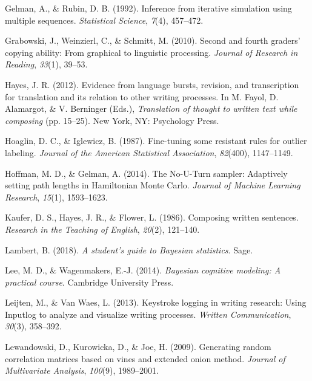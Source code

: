 \documentclass[english,jou,floatsintext]{apa7}
\begin{document}
\leavevmode\hypertarget{ref-gelman1992}{}%
Gelman, A., \& Rubin, D. B. (1992). Inference from iterative simulation using multiple sequences. \emph{Statistical Science}, \emph{7}(4), 457--472.

\leavevmode\hypertarget{ref-grabowski2010second}{}%
Grabowski, J., Weinzierl, C., \& Schmitt, M. (2010). Second and fourth graders' copying ability: From graphical to linguistic processing. \emph{Journal of Research in Reading}, \emph{33}(1), 39--53.

\leavevmode\hypertarget{ref-hayes2012evidence}{}%
Hayes, J. R. (2012). Evidence from language bursts, revision, and transcription for translation and its relation to other writing processes. In M. Fayol, D. Alamargot, \& V. Berninger (Eds.), \emph{Translation of thought to written text while composing} (pp. 15--25). New York, NY: Psychology Press.

\leavevmode\hypertarget{ref-hoaglin1987fine}{}%
Hoaglin, D. C., \& Iglewicz, B. (1987). Fine-tuning some resistant rules for outlier labeling. \emph{Journal of the American Statistical Association}, \emph{82}(400), 1147--1149.

\leavevmode\hypertarget{ref-hoffman2014no}{}%
Hoffman, M. D., \& Gelman, A. (2014). The No-U-Turn sampler: Adaptively setting path lengths in Hamiltonian Monte Carlo. \emph{Journal of Machine Learning Research}, \emph{15}(1), 1593--1623.

\leavevmode\hypertarget{ref-kaufer1986composing}{}%
Kaufer, D. S., Hayes, J. R., \& Flower, L. (1986). Composing written sentences. \emph{Research in the Teaching of English}, \emph{20}(2), 121--140.

\leavevmode\hypertarget{ref-lambert2018student}{}%
Lambert, B. (2018). \emph{A student's guide to Bayesian statistics}. Sage.

\leavevmode\hypertarget{ref-lee2014bayesian}{}%
Lee, M. D., \& Wagenmakers, E.-J. (2014). \emph{Bayesian cognitive modeling: A practical course}. Cambridge University Press.

\leavevmode\hypertarget{ref-leijten2013keystroke}{}%
Leijten, M., \& Van Waes, L. (2013). Keystroke logging in writing research: Using Inputlog to analyze and visualize writing processes. \emph{Written Communication}, \emph{30}(3), 358--392.

\leavevmode\hypertarget{ref-lewandowski2009generating}{}%
Lewandowski, D., Kurowicka, D., \& Joe, H. (2009). Generating random correlation matrices based on vines and extended onion method. \emph{Journal of Multivariate Analysis}, \emph{100}(9), 1989--2001.
\end{document}
